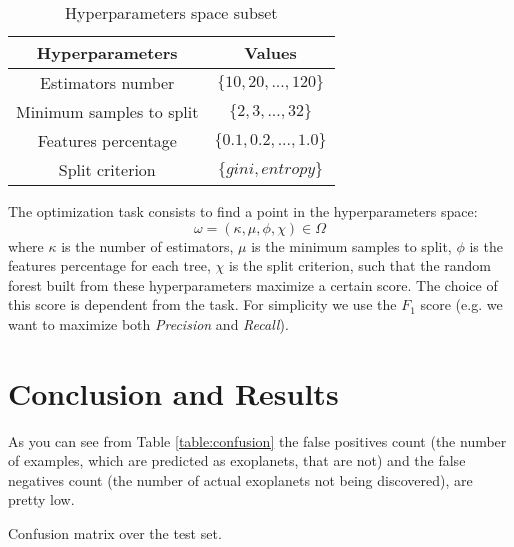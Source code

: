 \documentclass[11pt, a4paper]{article}
\begin{document}
\begin{multicols}{2}
  \begin{table}[H]
    \centering
    \begin{tabular}{|c c|}
      \hline
      Hyperparameters & Values \\
      \hline\hline
      Estimators number & $\{10,20,...,120\}$ \\
      \hline
      Minimum samples to split & $\{2,3,...,32\}$ \\
      \hline
      Features percentage & $\{0.1,0.2,...,1.0\}$ \\
      \hline
      Split criterion & $\{gini, entropy\}$ \\
      \hline
    \end{tabular}
    \caption{Hyperparameters space subset}
    \label{table:hyperparameters}
  \end{table}

  The optimization task consists to find a point in the hyperparameters space:
  \[\omega=(\kappa, \mu, \phi, \chi)\in\Omega\]
  where $\kappa$ is the number of estimators, $\mu$ is the minimum samples to split, $\phi$ is the features percentage for each tree, $\chi$ is the split criterion, such that the random forest built from these hyperparameters maximize a certain score. The choice of this score is dependent from the task. For simplicity we use the $F_{1}$ score (e.g. we want to maximize both \textit{Precision} and \textit{Recall}).

\section{Conclusion and Results}
  As you can see from Table \ref{table:confusion} the false positives count (the number of examples, which are predicted as exoplanets, that are not) and the false negatives count (the number of actual exoplanets not being discovered), are pretty low.
  \begin{table}[H]
    \centering
    \caption{Confusion matrix over the test set.}
    \label{table:confusion}
  \end{table}


\end{multicols}
\end{document}
